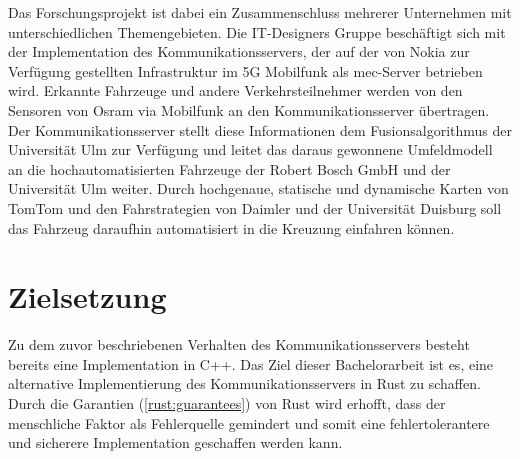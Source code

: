 Das Forschungsprojekt ist dabei ein Zusammenschluss mehrerer Unternehmen mit unterschiedlichen Themengebieten.
Die IT-Designers Gruppe beschäftigt sich mit der Implementation des Kommunikationsservers, der auf der von Nokia zur Verfügung gestellten Infrastruktur im 5G Mobilfunk als \gls{mec}-Server betrieben wird.
Erkannte Fahrzeuge und andere Verkehrsteilnehmer werden von den Sensoren von Osram via Mobilfunk an den Kommunikationsserver übertragen.
Der Kommunikationsserver stellt diese Informationen dem Fusionsalgorithmus der Universität Ulm zur Verfügung und leitet das daraus gewonnene Umfeldmodell an die hochautomatisierten Fahrzeuge der Robert Bosch GmbH  und der Universität Ulm weiter.
Durch hochgenaue, statische und dynamische Karten von TomTom und den Fahrstrategien von Daimler und der Universität Duisburg soll das Fahrzeug daraufhin automatisiert in die Kreuzung einfahren können.



\section{Zielsetzung}

Zu dem zuvor beschriebenen Verhalten des Kommunikationsservers besteht bereits eine Implementation in C++.
Das Ziel dieser Bachelorarbeit ist es, eine alternative Implementierung des Kommunikationsservers in Rust zu schaffen.
Durch die Garantien (\autoref{rust:guarantees}) von Rust wird erhofft, dass der menschliche Faktor als Fehlerquelle gemindert und somit eine fehlertolerantere und sicherere Implementation geschaffen werden kann.

